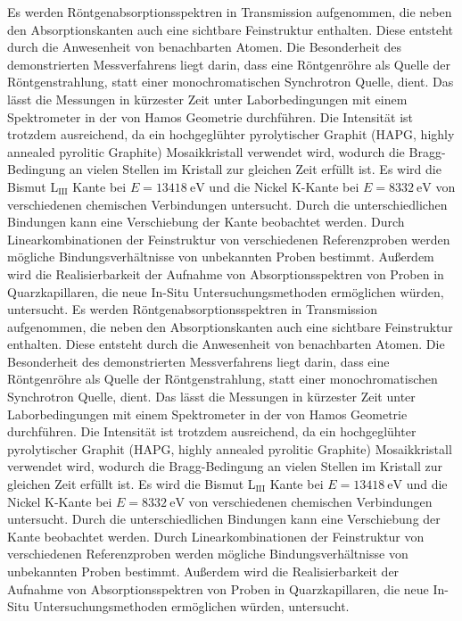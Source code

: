 Es werden Röntgenabsorptionsspektren in Transmission aufgenommen, die neben den Absorptionskanten auch eine sichtbare Feinstruktur enthalten. Diese entsteht durch die Anwesenheit von benachbarten Atomen. Die Besonderheit des demonstrierten Messverfahrens liegt darin, dass eine Röntgenröhre als Quelle der Röntgenstrahlung, statt einer monochromatischen Synchrotron Quelle, dient. Das lässt die Messungen in kürzester Zeit unter Laborbedingungen mit einem Spektrometer in der von Hamos Geometrie durchführen. Die Intensität ist trotzdem ausreichend, da ein hochgeglühter pyrolytischer Graphit (HAPG,  highly annealed pyrolitic Graphite) Mosaikkristall verwendet wird, wodurch die Bragg-Bedingung an vielen Stellen im Kristall zur gleichen Zeit erfüllt ist. Es wird die Bismut L$_\mathrm{III}$ Kante bei $E=\SI{13418}{\eV}$ und die Nickel K-Kante bei $E=\SI{8332}{\eV}$ von verschiedenen chemischen Verbindungen untersucht. Durch die unterschiedlichen Bindungen kann eine Verschiebung der Kante beobachtet werden. Durch Linearkombinationen der Feinstruktur von verschiedenen Referenzproben werden mögliche Bindungsverhältnisse von unbekannten Proben bestimmt. Außerdem wird die Realisierbarkeit der Aufnahme von Absorptionsspektren von Proben in Quarzkapillaren, die neue In-Situ Untersuchungsmethoden ermöglichen würden, untersucht.
Es werden Röntgenabsorptionsspektren in Transmission aufgenommen, die neben den Absorptionskanten auch eine sichtbare Feinstruktur enthalten. Diese entsteht durch die Anwesenheit von benachbarten Atomen. Die Besonderheit des demonstrierten Messverfahrens liegt darin, dass eine Röntgenröhre als Quelle der Röntgenstrahlung, statt einer monochromatischen Synchrotron Quelle, dient. Das lässt die Messungen in kürzester Zeit unter Laborbedingungen mit einem Spektrometer in der von Hamos Geometrie durchführen. Die Intensität ist trotzdem ausreichend, da ein hochgeglühter pyrolytischer Graphit (HAPG,  highly annealed pyrolitic Graphite) Mosaikkristall verwendet wird, wodurch die Bragg-Bedingung an vielen Stellen im Kristall zur gleichen Zeit erfüllt ist. Es wird die Bismut L$_\mathrm{III}$ Kante bei $E=\SI{13418}{\eV}$ und die Nickel K-Kante bei $E=\SI{8332}{\eV}$ von verschiedenen chemischen Verbindungen untersucht. Durch die unterschiedlichen Bindungen kann eine Verschiebung der Kante beobachtet werden. Durch Linearkombinationen der Feinstruktur von verschiedenen Referenzproben werden mögliche Bindungsverhältnisse von unbekannten Proben bestimmt. Außerdem wird die Realisierbarkeit der Aufnahme von Absorptionsspektren von Proben in Quarzkapillaren, die neue In-Situ Untersuchungsmethoden ermöglichen würden, untersucht.

